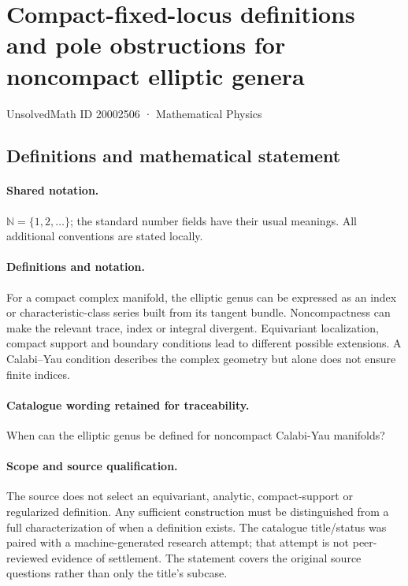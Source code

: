 \documentclass[11pt]{article}
\begin{document}
\setcounter{section}{20002505}
\section{Compact-fixed-locus definitions and pole obstructions for noncompact elliptic genera}\label{20002506}
{\small UnsolvedMath ID 20002506 · Mathematical Physics}
\subsection{Definitions and mathematical statement}

\paragraph{Shared notation.}$\mathbb N=\{1,2,\ldots\}$; the standard number fields have their usual meanings. All additional conventions are stated locally.


\paragraph{Definitions and notation.}For a compact complex manifold, the elliptic genus can be expressed as an index or characteristic-class series built from its tangent bundle. Noncompactness can make the relevant trace, index or integral divergent. Equivariant localization, compact support and boundary conditions lead to different possible extensions. A Calabi--Yau condition describes the complex geometry but alone does not ensure finite indices.

\paragraph{Catalogue wording retained for traceability.}
When can the elliptic genus be defined for noncompact Calabi-Yau manifolds?
\paragraph{Scope and source qualification.}The source does not select an equivariant, analytic, compact-support or regularized definition. Any sufficient construction must be distinguished from a full characterization of when a definition exists. The catalogue title/status was paired with a machine-generated research attempt; that attempt is not peer-reviewed evidence of settlement. The statement covers the original source questions rather than only the title’s subcase.
\end{document}
